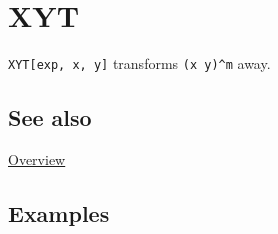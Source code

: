 \documentclass[../FeynCalcManual.tex]{subfiles}
\begin{document}
\hypertarget{xyt}{
\section{XYT}\label{xyt}}

\texttt{XYT[\allowbreak{}exp,\ \allowbreak{}x,\ \allowbreak{}y]}
transforms \texttt{(x y)^m} away.

\subsection{See also}

\hyperlink{toc}{Overview}

\subsection{Examples}
\end{document}
